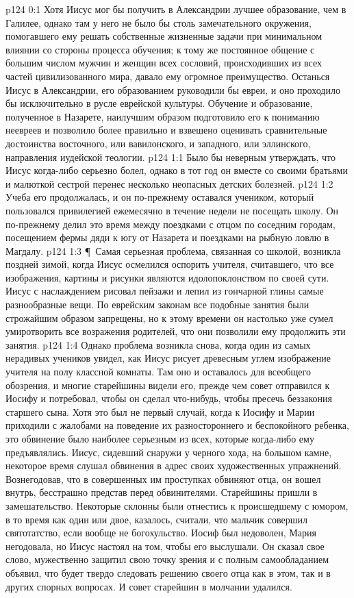 \vs p124 0:1 Хотя Иисус мог бы получить в Александрии лучшее образование, чем в Галилее, однако там у него не было бы столь замечательного окружения, помогавшего ему решать собственные жизненные задачи при минимальном влиянии со стороны процесса обучения; к тому же постоянное общение с большим числом мужчин и женщин всех сословий, происходивших из всех частей цивилизованного мира, давало ему огромное преимущество. Останься Иисус в Александрии, его образованием руководили бы евреи, и оно проходило бы исключительно в русле еврейской культуры. Обучение и образование, полученное в Назарете, наилучшим образом подготовило его к пониманию неевреев и позволило более правильно и взвешено оценивать сравнительные достоинства восточного, или вавилонского, и западного, или эллинского, направления иудейской теологии.
\vs p124 1:1 Было бы неверным утверждать, что Иисус когда\hyp{}либо серьезно болел, однако в тот год он вместе со своими братьями и малюткой сестрой перенес несколько неопасных детских болезней.
\vs p124 1:2 Учеба его продолжалась, и он по\hyp{}прежнему оставался учеником, который пользовался привилегией ежемесячно в течение недели не посещать школу. Он по\hyp{}прежнему делил это время между поездками с отцом по соседним городам, посещением фермы дяди к югу от Назарета и поездками на рыбную ловлю в Магдалу.
\vs p124 1:3 \P\ Самая серьезная проблема, связанная со школой, возникла поздней зимой, когда Иисус осмелился оспорить учителя, считавшего, что все изображения, картины и рисунки являются идолопоклонством по своей сути. Иисус с наслаждением рисовал пейзажи и лепил из гончарной глины самые разнообразные вещи. По еврейским законам все подобные занятия были строжайшим образом запрещены, но к этому времени он настолько уже сумел умиротворить все возражения родителей, что они позволили ему продолжить эти занятия.
\vs p124 1:4 Однако проблема возникла снова, когда один из самых нерадивых учеников увидел, как Иисус рисует древесным углем изображение учителя на полу классной комнаты. Там оно и оставалось для всеобщего обозрения, и многие старейшины видели его, прежде чем совет отправился к Иосифу и потребовал, чтобы он сделал что\hyp{}нибудь, чтобы пресечь беззакония старшего сына. Хотя это был не первый случай, когда к Иосифу и Марии приходили с жалобами на поведение их разностороннего и беспокойного ребенка, это обвинение было наиболее серьезным из всех, которые когда\hyp{}либо ему предъявлялись. Иисус, сидевший снаружи у черного хода, на большом камне, некоторое время слушал обвинения в адрес своих художественных упражнений. Вознегодовав, что в совершенных им проступках обвиняют отца, он вошел внутрь, бесстрашно представ перед обвинителями. Старейшины пришли в замешательство. Некоторые склонны были отнестись к происшедшему с юмором, в то время как один или двое, казалось, считали, что мальчик совершил святотатство, если вообще не богохульство. Иосиф был недоволен, Мария негодовала, но Иисус настоял на том, чтобы его выслушали. Он сказал свое слово, мужественно защитил свою точку зрения и с полным самообладанием объявил, что будет твердо следовать решению своего отца как в этом, так и в других спорных вопросах. И совет старейшин в молчании удалился.
